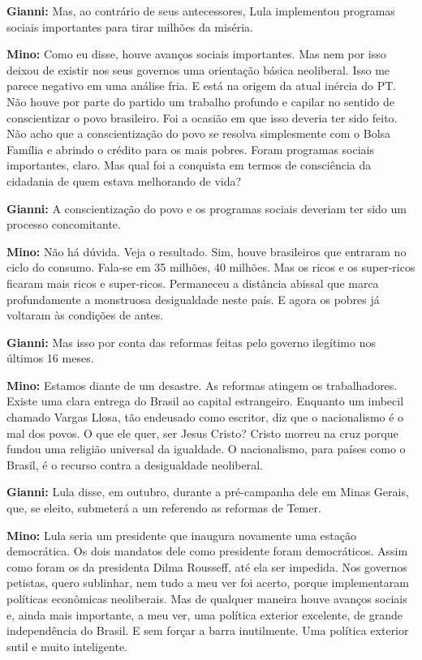 \textbf{Gianni:} Mas, ao contrário de seus antecessores, Lula
implementou programas sociais importantes para tirar milhões da miséria.

\textbf{Mino:} Como eu disse, houve avanços sociais importantes. Mas nem
por isso deixou de existir nos seus governos uma orientação básica
neoliberal. Isso me parece negativo em uma análise fria. E está na
origem da atual inércia do PT. Não houve por parte do partido um
trabalho profundo e capilar no sentido de conscientizar o povo
brasileiro. Foi a ocasião em que isso deveria ter sido feito. Não acho
que a conscientização do povo se resolva simplesmente com o Bolsa
Família e abrindo o crédito para os mais pobres. Foram programas sociais
importantes, claro. Mas qual foi a conquista em termos de consciência da
cidadania de quem estava melhorando de vida?

\textbf{Gianni:} A conscientização do povo e os programas sociais
deveriam ter sido um processo concomitante.

\textbf{Mino:} Não há dúvida. Veja o resultado. Sim, houve brasileiros
que entraram no ciclo do consumo. Fala-se em 35 milhões, 40 milhões. Mas
os ricos e os super-ricos ficaram mais ricos e super-ricos. Permaneceu a
distância abissal que marca profundamente a monstruosa desigualdade
neste país. E agora os pobres já voltaram às condições de antes.

\textbf{Gianni:} Mas isso por conta das reformas feitas pelo governo
ilegítimo nos últimos 16 meses.

\textbf{Mino:} Estamos diante de um desastre. As reformas atingem os
trabalhadores. Existe uma clara entrega do Brasil ao capital
estrangeiro. Enquanto um imbecil chamado Vargas Llosa, tão endeusado
como escritor, diz que o nacionalismo é o mal dos povos. O que ele quer,
ser Jesus Cristo? Cristo morreu na cruz porque fundou uma religião
universal da igualdade. O nacionalismo, para países como o Brasil, é o
recurso contra a desigualdade neoliberal.

\textbf{Gianni:} Lula disse, em outubro, durante a pré-campanha dele em
Minas Gerais, que, se eleito, submeterá a um referendo as reformas de
Temer.

\textbf{Mino:} Lula seria um presidente que inaugura novamente uma
estação democrática. Os dois mandatos dele como presidente foram
democráticos. Assim como foram os da presidenta Dilma Rousseff, até ela
ser impedida. Nos governos petistas, quero sublinhar, nem tudo a meu ver
foi acerto, porque implementaram políticas econômicas neoliberais. Mas
de qualquer maneira houve avanços sociais e, ainda mais importante, a
meu ver, uma política exterior excelente, de grande independência do
Brasil. E sem forçar a barra inutilmente. Uma política exterior sutil e
muito inteligente.

